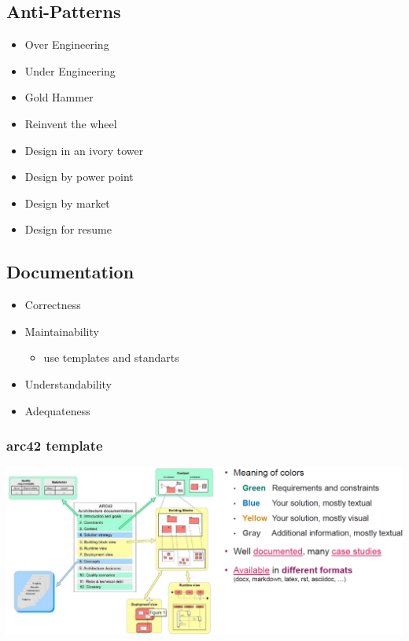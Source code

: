 \subsection{Anti-Patterns}
\begin{itemize}
    \item Over Engineering
    \item Under Engineering
    \item Gold Hammer
    \item Reinvent the wheel
    \item Design in an ivory tower
    \item Design by power point
    \item Design by market
    \item Design for resume
\end{itemize}

\subsection{Documentation}
\begin{itemize}
    \item Correctness
    \item Maintainability
    \begin{itemize}
        \item use templates and standarts
    \end{itemize}
    \item Understandability
    \item Adequateness
\end{itemize}

\subsubsection{arc42 template}
\includegraphics[width=\linewidth]{../img/arc42.png}

